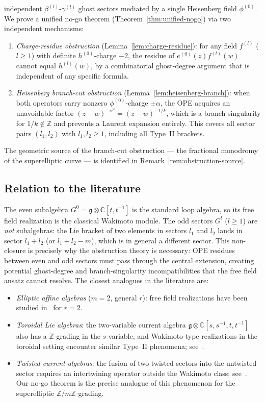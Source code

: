 \documentclass[12pt]{article}
\theoremstyle{plain}
\theoremstyle{definition}
\theoremstyle{remark}
\newcommand{\C}{\mathbb{C}}
\newcommand{\Z}{\mathbb{Z}}
\newcommand{\g}{\mathfrak{g}}
\begin{document}
\begin{enumerate}
independent $\beta^{(l)}$-$\gamma^{(l)}$ ghost sectors mediated by a single
Heisenberg field $\phi^{(0)}$.
We prove a unified no-go theorem (Theorem~\ref{thm:unified-nogo}) via two
independent mechanisms:
\begin{enumerate}[nosep,label=\textup{(\arabic*)}]
  \item \emph{Charge-residue obstruction} (Lemma~\ref{lem:charge-residue}):
    for any field $f^{(l)}$ ($l\geq 1$) with definite $h^{(0)}$-charge $-2$,
    the residue of $e^{(0)}(z)f^{(l)}(w)$ cannot equal $h^{(l)}(w)$, by a
    combinatorial ghost-degree argument that is independent of any specific formula.
  \item \emph{Heisenberg branch-cut obstruction} (Lemma~\ref{lem:heisenberg-branch}):
    when both operators carry nonzero $\phi^{(0)}$-charge $\pm\alpha$, the OPE
    acquires an unavoidable factor $(z-w)^{-\alpha^2}=(z-w)^{-1/k}$, which is
    a branch singularity for $1/k\notin\Z$ and prevents a Laurent expansion
    entirely. This covers all sector pairs $(l_1,l_2)$ with $l_1,l_2\geq 1$,
    including all Type~II brackets.
\end{enumerate}
The geometric source of the branch-cut obstruction --- the fractional monodromy
of the superelliptic curve --- is identified in Remark~\ref{rem:obstruction-source}.
\end{enumerate}



\subsection{Relation to the literature}
The even subalgebra $G^0 = \g\otimes\C[t,t^{-1}]$ is the standard loop algebra,
so its free field realization is the classical Wakimoto module.
The odd sectors $G^l$ ($l\geq 1$) are \emph{not} subalgebras: the Lie bracket
of two elements in sectors $l_1$ and $l_2$ lands in sector $l_1+l_2$ (or
$l_1+l_2-m$), which is in general a different sector.
This non-closure is precisely why the obstruction theory is necessary: OPE residues
between even and odd sectors must pass through the central extension, creating
potential ghost-degree and branch-singularity incompatibilities that the free field
ansatz cannot resolve.
The closest analogues in the literature are:
\begin{itemize}[nosep]
  \item \emph{Elliptic affine algebras} ($m=2$, general $r$): free field
    realizations have been studied in~\cite{BCF09} for $r=2$.
  \item \emph{Toroidal Lie algebras}: the two-variable current algebra
    $\g\otimes\C[s,s^{-1},t,t^{-1}]$ also has a $\Z$-grading in the
    $s$-variable, and Wakimoto-type realizations in the toroidal setting
    encounter similar Type~II phenomena; see~\cite{BEHHH,Beem}.
  \item \emph{Twisted current algebras}: the fusion of two twisted sectors
    into the untwisted sector requires an intertwining operator outside
    the Wakimoto class; see~\cite{Kac}.
    Our no-go theorem is the precise analogue of this phenomenon for the
    superelliptic $\Z/m\Z$-grading.
\end{itemize}
\end{document}
